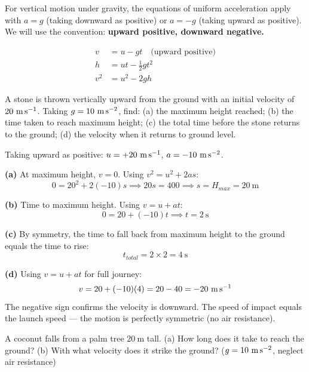 For vertical motion under gravity, the equations of
uniform acceleration apply with $a = g$ (taking downward
as positive) or $a = -g$ (taking upward as positive).
We will use the convention: \textbf{upward positive,
downward negative.}

\begin{align*}
  v &= u - gt \quad \text{(upward positive)}\\
  h &= ut - \tfrac{1}{2}gt^2\\
  v^2 &= u^2 - 2gh
\end{align*}

\begin{examplebox}[3.4]
A stone is thrown vertically upward from the ground
with an initial velocity of $20\ \text{m\,s}^{-1}$.
Taking $g = 10\ \text{m\,s}^{-2}$, find:
(a) the maximum height reached;
(b) the time taken to reach maximum height;
(c) the total time before the stone returns to the
ground;
(d) the velocity when it returns to ground level.
\end{examplebox}

\begin{solutionbox}
Taking upward as positive: $u = +20\ \text{m\,s}^{-1}$,
$a = -10\ \text{m\,s}^{-2}$.

\textbf{(a)} At maximum height, $v = 0$. Using
$v^2 = u^2 + 2as$:
\[
  0 = 20^2 + 2(-10)s
  \implies 20s = 400
  \implies s = H_{max} = 20\ \text{m}
\]

\textbf{(b)} Time to maximum height. Using $v = u + at$:
\[
  0 = 20 + (-10)t \implies t = 2\ \text{s}
\]

\textbf{(c)} By symmetry, the time to fall back from
maximum height to the ground equals the time to rise:
\[
  t_{total} = 2 \times 2 = 4\ \text{s}
\]

\textbf{(d)} Using $v = u + at$ for full journey:
\[
  v = 20 + (-10)(4) = 20 - 40 = -20\ \text{m\,s}^{-1}
\]
The negative sign confirms the velocity is downward.
The speed of impact equals the launch speed --- the
motion is perfectly symmetric (no air resistance).
\end{solutionbox}

\begin{examplebox}[3.5]
A coconut falls from a palm tree $20\ \text{m}$ tall.
(a) How long does it take to reach the ground?
(b) With what velocity does it strike the ground?
($g = 10\ \text{m\,s}^{-2}$, neglect air resistance)
\end{examplebox}

